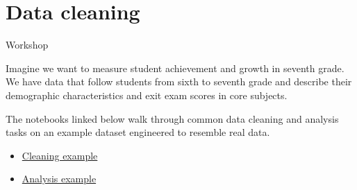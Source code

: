 \documentclass{beamer}
\begin{document}
\section{Data cleaning}

\begin{frame}{Workshop}

  Imagine we want to measure student achievement and growth in seventh grade. We have data that follow students from sixth to seventh grade and describe their demographic characteristics and exit exam scores in core subjects.

  The notebooks linked below walk through common data cleaning and analysis tasks on an example dataset engineered to resemble real data.

  \begin{itemize}
    \item \href{https://github.com/lavalleedelgado/penn-gse-data-workshop/blob/main/src/01-clean-data.ipynb}{Cleaning example}
    \item \href{https://github.com/lavalleedelgado/penn-gse-data-workshop/blob/main/src/02-run-analysis.ipynb}{Analysis example}
  \end{itemize}

\end{frame}
\end{document}
